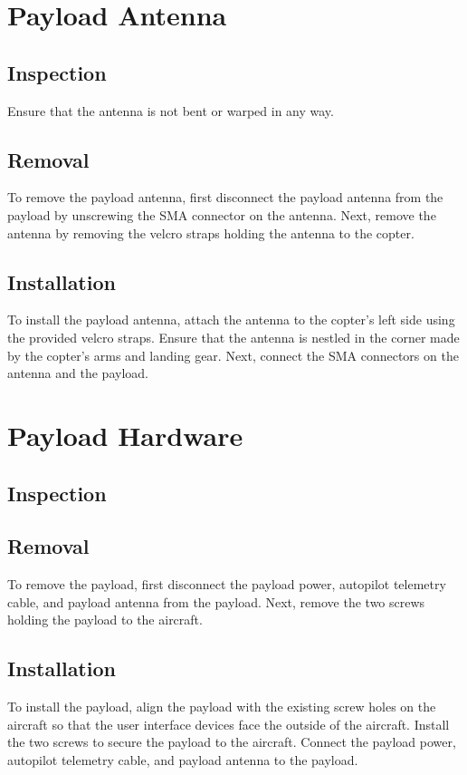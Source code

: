 \documentclass{report}
\begin{document}
	\section{Payload Antenna}
		\subsection{Inspection}
			Ensure that the antenna is not bent or warped in any way.

		\subsection{Removal}
		To remove the payload antenna, first disconnect the payload antenna from the payload by unscrewing the SMA connector on the antenna.  Next, remove the antenna by removing the velcro straps holding the antenna to the copter.

		\subsection{Installation}
		To install the payload antenna, attach the antenna to the copter's left side using the provided velcro straps.  Ensure that the antenna is nestled in the corner made by the copter's arms and landing gear.  Next, connect the SMA connectors on the antenna and the payload.
	\section{Payload Hardware}
		\subsection{Inspection}

		\subsection{Removal}
		To remove the payload, first disconnect the payload power, autopilot telemetry cable, and payload antenna from the payload.  Next, remove the two screws holding the payload to the aircraft.

		\subsection{Installation}
		To install the payload, align the payload with the existing screw holes on the aircraft so that the user interface devices face the outside of the aircraft.  Install the two screws to secure the payload to the aircraft.  Connect the payload power, autopilot telemetry cable, and payload antenna to the payload.
\end{document}
